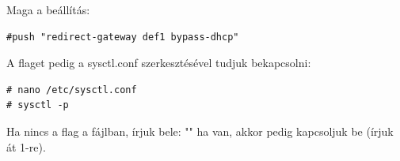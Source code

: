 Maga a beállítás:
\begin{verbatim}
#push "redirect-gateway def1 bypass-dhcp"
\end{verbatim}

A  flaget pedig a sysctl.conf szerkesztésével tudjuk bekapcsolni:
\begin{verbatim}
# nano /etc/sysctl.conf
# sysctl -p
\end{verbatim}
Ha nincs a flag a fájlban, írjuk bele: "" ha van, akkor pedig kapcsoljuk be (írjuk át 1-re).


